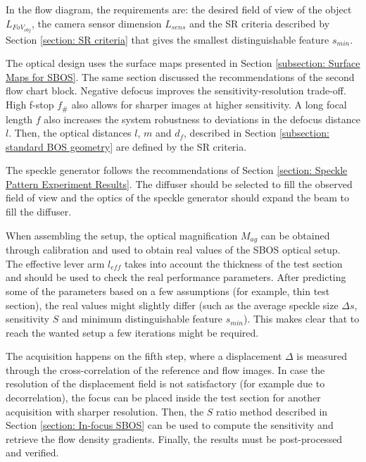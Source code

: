 

In the flow diagram, the requirements are: the desired field of view of the object $L_{FoV_{obj}}$, the camera sensor dimension $L_{sens}$ and the SR criteria described by Section \ref{section: SR criteria} that gives the smallest distinguishable feature $s_{min}$.

The optical design uses the surface maps presented in Section \ref{subsection: Surface Maps for SBOS}. The same section discussed the recommendations of the second flow chart block. Negative defocus improves the sensitivity-resolution trade-off. High f-stop $f_\#$ also allows for sharper images at higher sensitivity. A long focal length $f$ also increases the system robustness to deviations in the defocus distance $l$. Then, the optical distances $l$, $m$ and $d_f$, described in Section \ref{subsection: standard BOS geometry} are defined by the SR criteria.

The speckle generator follows the recommendations of Section \ref{section: Speckle Pattern Experiment Results}. The diffuser should be selected to fill the observed field of view and the optics of the speckle generator should expand the beam to fill the diffuser.

When assembling the setup, the optical magnification $M_{ag}$ can be obtained through calibration and used to obtain real values of the SBOS optical setup. The effective lever arm $l_{eff}$ takes into account the thickness of the test section and should be used to check the real performance parameters. After predicting some of the parameters based on a few assumptions (for example, thin test section), the real values might slightly differ (such as the average speckle size $\Delta s$, sensitivity $S$ and minimum distinguishable feature $s_{min}$). This makes clear that to reach the wanted setup a few iterations might be required.

The acquisition happens on the fifth step, where a displacement $\Delta$ is measured through the cross-correlation of the reference and flow images. In case the resolution of the displacement field is not satisfactory (for example due to decorrelation), the focus can be placed inside the test section for another acquisition with sharper resolution. Then, the $S$ ratio method described in Section \ref{section: In-focus SBOS} can be used to compute the sensitivity and retrieve the flow density gradients. Finally, the results must be post-processed and verified.

\FloatBarrier

